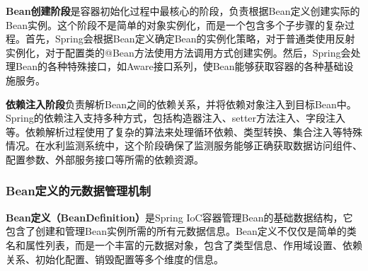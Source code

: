 \begin{Shaded}
\begin{Highlighting}[]
\CommentTok{/**}
 \CommentTok{*}
 \CommentTok{*} 
 \CommentTok{*} 
 \CommentTok{*} \CommentTok{:} 
 \CommentTok{*} \CommentTok{:} 
 \CommentTok{*} \CommentTok{:} 
 \CommentTok{*} \CommentTok{:} 
 \CommentTok{*} \CommentTok{:} 
 \CommentTok{*} \CommentTok{:} 
 \CommentTok{*} \CommentTok{/}\CommentTok{:} 
 \CommentTok{*/}
\end{Highlighting}
\end{Shaded}

\textbf{Bean创建阶段}是容器初始化过程中最核心的阶段，负责根据Bean定义创建实际的Bean实例。这个阶段不是简单的对象实例化，而是一个包含多个子步骤的复杂过程。首先，Spring会根据Bean定义确定Bean的实例化策略，对于普通类使用反射实例化，对于配置类的@Bean方法使用方法调用方式创建实例。然后，Spring会处理Bean的各种特殊接口，如Aware接口系列，使Bean能够获取容器的各种基础设施服务。

\textbf{依赖注入阶段}负责解析Bean之间的依赖关系，并将依赖对象注入到目标Bean中。Spring的依赖注入支持多种方式，包括构造器注入、setter方法注入、字段注入等。依赖解析过程使用了复杂的算法来处理循环依赖、类型转换、集合注入等特殊情况。在水利监测系统中，这个阶段确保了监测服务能够正确获取数据访问组件、配置参数、外部服务接口等所需的依赖资源。

\subsubsection{Bean定义的元数据管理机制}\label{beanux5b9aux4e49ux7684ux5143ux6570ux636eux7ba1ux7406ux673aux5236}

\textbf{Bean定义（BeanDefinition）}是Spring IoC容器管理Bean的基础数据结构，它包含了创建和管理Bean实例所需的所有元数据信息。Bean定义不仅仅是简单的类名和属性列表，而是一个丰富的元数据对象，包含了类型信息、作用域设置、依赖关系、初始化配置、销毁配置等多个维度的信息。

